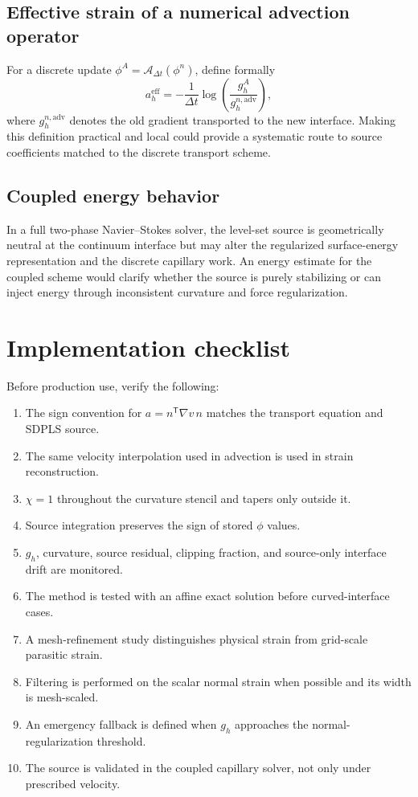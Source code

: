 \documentclass[11pt,a4paper]{article}
\theoremstyle{definition}
\theoremstyle{remark}
\begin{document}
\subsection{Effective strain of a numerical advection operator}

For a discrete update $\phi^{A}=\mathcal A_{\Delta t}(\phi^n)$, define formally
\begin{equation}
  a_h^{\mathrm{eff}}
  =-\frac1{\Delta t}\log\left(\frac{g_h^A}{g_h^{n,\mathrm{adv}}}\right),
  \label{eq:effective-strain}
\end{equation}
where $g_h^{n,\mathrm{adv}}$ denotes the old gradient transported to the new interface. Making this definition practical and local could provide a systematic route to source coefficients matched to the discrete transport scheme.

\subsection{Coupled energy behavior}

In a full two-phase Navier--Stokes solver, the level-set source is geometrically neutral at the continuum interface but may alter the regularized surface-energy representation and the discrete capillary work. An energy estimate for the coupled scheme would clarify whether the source is purely stabilizing or can inject energy through inconsistent curvature and force regularization.

\section{Implementation checklist}

Before production use, verify the following:
\begin{enumerate}
  \item The sign convention for $a=n^{\mathsf T}\nabla v\,n$ matches the transport equation and SDPLS source.
  \item The same velocity interpolation used in advection is used in strain reconstruction.
  \item $\chi=1$ throughout the curvature stencil and tapers only outside it.
  \item Source integration preserves the sign of stored $\phi$ values.
  \item $g_h$, curvature, source residual, clipping fraction, and source-only interface drift are monitored.
  \item The method is tested with an affine exact solution before curved-interface cases.
  \item A mesh-refinement study distinguishes physical strain from grid-scale parasitic strain.
  \item Filtering is performed on the scalar normal strain when possible and its width is mesh-scaled.
  \item An emergency fallback is defined when $g_h$ approaches the normal-regularization threshold.
  \item The source is validated in the coupled capillary solver, not only under prescribed velocity.
\end{enumerate}
\end{document}
